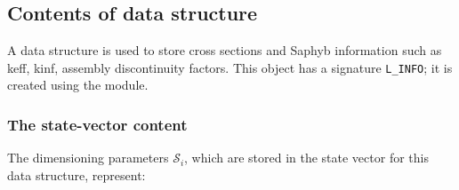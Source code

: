 \subsection{Contents of  data structure}\label{sect:d2pdir}

A  data structure is used to store cross sections and 
Saphyb information such as keff, kinf, assembly discontinuity factors. This object has a signature {\tt L\_INFO}; it is created using the  module.

\subsubsection{The state-vector content}\label{sect:infostate}

\noindent
The dimensioning parameters $\mathcal{S}_i$, which are stored in the state
vector for this data structure, represent:

